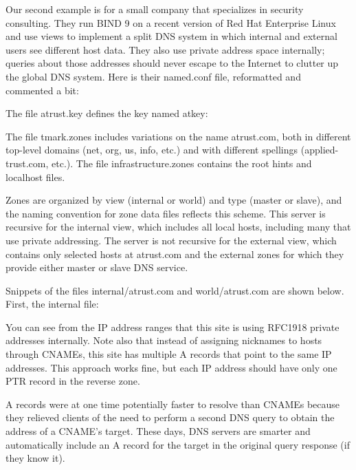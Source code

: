 Our second example is for a small company that specializes in security
consulting. They run BIND 9 on a recent version of Red Hat Enterprise
Linux and use views to implement a split DNS system in which internal
and external users see different host data. They also use private
address space internally; queries about those addresses should never
escape to the Internet to clutter up the global DNS system. Here is
their {named.conf }file, reformatted and commented a bit:



The file {atrust.key} defines the key named {atkey}:


The file {tmark.zones} includes variations on the name atrust.com, both
in different top-level domains (net, org, us, info, etc.) and with
different spellings ({applied-trust.com}, etc.). The file
{infrastructure.zones} contains the root hints and localhost files.

Zones are organized by view (internal or world) and type (master or
slave), and the naming convention for zone data files reflects this
scheme. This server is recursive for the internal view, which includes
all local hosts, including many that use private addressing. The server
is not recursive for the external view, which contains only selected
hosts at atrust.com and the external zones for which they provide either
master or slave DNS service.

Snippets of the files {internal/atrust.com} and {world/atrust.com} are
shown below. First, the {internal} file:


You can see from the IP address ranges that this site is using RFC1918
private addresses internally. Note also that instead of assigning
nicknames to hosts through CNAMEs, this site has multiple A records that
point to the same IP addresses. This approach works fine, but each IP
address should have only one PTR record in the reverse zone.

A records were at one time potentially faster to resolve than CNAMEs
because they relieved clients of the need to perform a second DNS query
to obtain the address of a CNAME's target. These days, DNS servers are
smarter and automatically include an A record for the target in the
original query response (if they know it).

